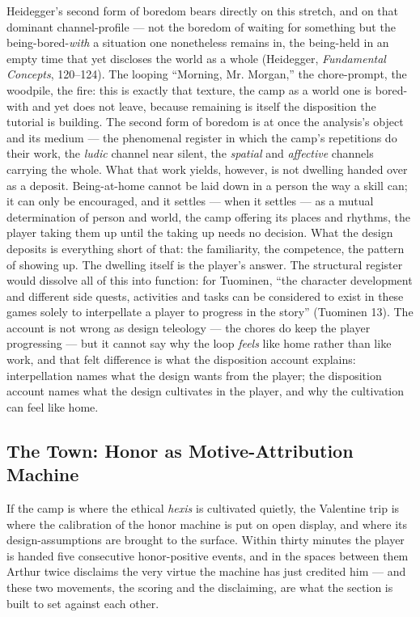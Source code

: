 Heidegger's second form of boredom bears directly on this stretch, and on that dominant channel-profile — not the boredom of waiting for something but the being-bored-\textit{with} a situation one nonetheless remains in, the being-held in an empty time that yet discloses the world as a whole (Heidegger, \textit{Fundamental Concepts}, 120–124). The looping ``Morning, Mr. Morgan,'' the chore-prompt, the woodpile, the fire: this is exactly that texture, the camp as a world one is bored-with and yet does not leave, because remaining is itself the disposition the tutorial is building. The second form of boredom is at once the analysis's object and its medium — the phenomenal register in which the camp's repetitions do their work, the \textit{ludic} channel near silent, the \textit{spatial} and \textit{affective} channels carrying the whole. What that work yields, however, is not dwelling handed over as a deposit. Being-at-home cannot be laid down in a person the way a skill can; it can only be encouraged, and it settles — when it settles — as a mutual determination of person and world, the camp offering its places and rhythms, the player taking them up until the taking up needs no decision. What the design deposits is everything short of that: the familiarity, the competence, the pattern of showing up. The dwelling itself is the player's answer.
The structural register would dissolve all of this into function: for Tuominen, ``the character development and different side quests, activities and tasks can be considered to exist in these games solely to interpellate a player to progress in the story'' (Tuominen 13). The account is not wrong as design teleology — the chores do keep the player progressing — but it cannot say why the loop \textit{feels} like home rather than like work, and that felt difference is what the disposition account explains: interpellation names what the design wants from the player; the disposition account names what the design cultivates in the player, and why the cultivation can feel like home.

\bigskip

\subsection*{The Town: Honor as Motive-Attribution Machine}

If the camp is where the ethical \textit{hexis} is cultivated quietly, the Valentine trip is where the calibration of the honor machine is put on open display, and where its design-assumptions are brought to the surface. Within thirty minutes the player is handed five consecutive honor-positive events, and in the spaces between them Arthur twice disclaims the very virtue the machine has just credited him — and these two movements, the scoring and the disclaiming, are what the section is built to set against each other.

